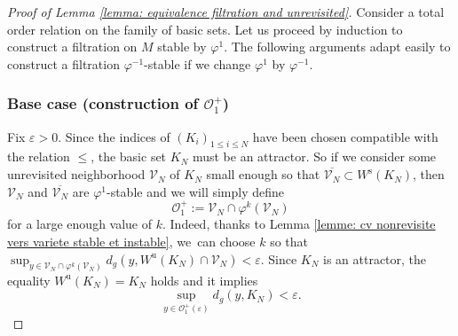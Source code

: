 \documentclass[11pt]{article}
\newcommand{\rs}{\mathrm{s}}
\newcommand{\ru}{\mathrm{u}}
\theoremstyle{definition}
\theoremstyle{plain}
\newcommand{\Ocal}{\mathcal{O}}
\newcommand{\Vcal}{\mathcal{V}}
\begin{document}
\begin{proof}[Proof of Lemma \ref{lemma: equivalence filtration and unrevisited}] Consider a total order relation on the family of basic sets. Let us proceed by induction to construct a filtration on $M$ stable by $\varphi^{1}$. The following arguments adapt easily to construct a filtration $\varphi^{-1}$-stable if we change $\varphi^1$ by $\varphi^{-1}$.

\subsubsection*{Base case (construction of $\Ocal_1^+$)}
Fix $\varepsilon > 0$. Since the indices of $(K_i)_{1 \leq i \leq N}$ have been chosen compatible with the relation $\leq$, the basic set $K_{N}$ must be an attractor. So if we consider some unrevisited neighborhood $\Vcal_{N}$ of $K_N$ small enough so that $\overline{\Vcal_N} \subset W^\rs(K_N)$, then $\Vcal_N$ and $\overline{\Vcal_N}$ are $\varphi^1$-stable and we will simply define
\[
\Ocal_{1}^+:= \Vcal_N \cap \varphi^{k}(\Vcal_{N})
\]
for a large enough value of $k$. Indeed, thanks to Lemma \ref{lemme: cv nonrevisite vers variete stable et instable}, we~can choose $k$ so that $\sup_{y \in \Vcal_N \cap \varphi^{k}(\Vcal_{N})} d_g (y, W^\ru (K_{N}) \cap \Vcal_N) < \varepsilon $. Since $K_N$ is an attractor, the equality $W^\ru (K_N) = K_N$ holds and it implies
\[
\sup_{y \in \Ocal_{1}^+ (\varepsilon)} d_g (y, K_N) < \varepsilon.
\]


\end{proof}
\end{document}
